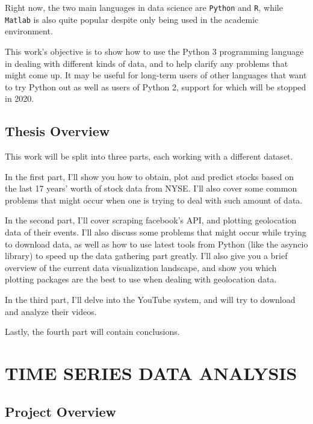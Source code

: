\documentclass[12pt, a4paper]{article}
\begin{document}
Right now, the two main languages in data science are \texttt{Python} and \texttt{R}, while \texttt{Matlab} is also quite popular despite only being used in the academic environment.

This work's objective is to show how to use the Python 3 programming language in dealing with different kinds of data, and to help clarify any problems that might come up. It may be useful for long-term users of other languages that want to try Python out as well as users of Python 2, support for which will be stopped in 2020.
\subsection{Thesis Overview}
This work will be split into three parts, each working with a different dataset.

In the first part, I'll show you how to obtain, plot and predict stocks based on the last 17 years' worth of stock data from NYSE\footnotemark. I'll also cover some common problems that might occur when one is trying to deal with such amount of data.

In the second part, I'll cover scraping facebook's API, and plotting geolocation data of their events. I'll also discuss some problems that might occur while trying to download data, as well as how to use latest tools from Python (like the asyncio library) to speed up the data gathering part greatly. I'll also give you a brief overview of the current data visualization landscape, and show you which plotting packages are the best to use when dealing with geolocation data.

In the third part, I'll delve into the YouTube system, and will try to download and analyze their videos.

Lastly, the fourth part will contain conclusions.

\newpage
\section{TIME SERIES DATA ANALYSIS}
\subsection{Project Overview}
\end{document}
